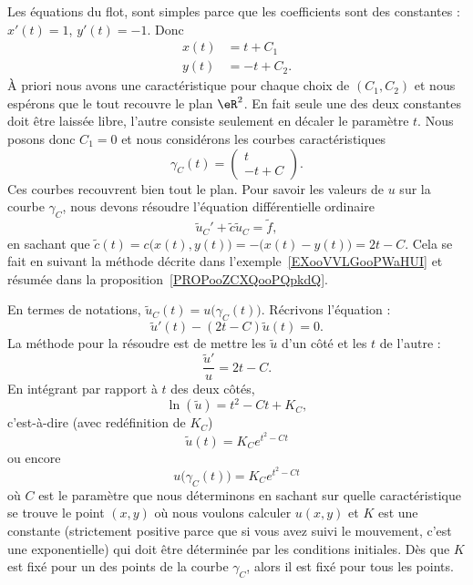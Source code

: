 Les équations du flot, sont simples parce que les coefficients sont des constantes : \( x'(t)=1\), \( y'(t)=-1\). Donc
\begin{subequations}
	\begin{align}
		x(t) & =t+C_1   \\
		y(t) & =-t+C_2.
	\end{align}
\end{subequations}
À priori nous avons une caractéristique pour chaque choix de \( (C_1,C_2)\) et nous espérons que le tout recouvre le plan \( \eR^2\). En fait seule une des deux constantes doit être laissée libre, l'autre consiste seulement en décaler le paramètre \( t\). Nous posons donc \( C_1=0\) et nous considérons les courbes caractéristiques
\begin{equation}
	\gamma_C(t)=\begin{pmatrix}
		t \\
		-t+C
	\end{pmatrix}.
\end{equation}
Ces courbes recouvrent bien tout le plan. Pour savoir les valeurs de \( u\) sur la courbe \( \gamma_C\), nous devons résoudre l'équation différentielle ordinaire
\begin{equation}
	\tilde u_C'+\tilde c\tilde u_C=\tilde f,
\end{equation}
en sachant que \( \tilde c(t)=c\big( x(t),y(t) \big)=-\big( x(t)-y(t) \big)=2t-C\). Cela se fait en suivant la méthode décrite dans l'exemple~\ref{EXooVVLGooPWaHUI} et résumée dans la proposition~\ref{PROPooZCXQooPQpkdQ}.

En termes de notations, \( \tilde u_C(t)=u\big( \gamma_C(t) \big)\). Récrivons l'équation :
\begin{equation}
	\tilde u'(t)-(2t-C)\tilde u(t)=0.
\end{equation}
La méthode pour la résoudre est de mettre les \( \tilde u\) d'un côté et les \( t\) de l'autre :
\begin{equation}
	\frac{ \tilde u' }{ u }=2t-C.
\end{equation}
En intégrant par rapport à \( t\) des deux côtés,
\begin{equation}
	\ln(\tilde u)=t^2-Ct+K_C,
\end{equation}
c'est-à-dire (avec redéfinition de \( K_C\))
\begin{equation}
	\tilde u(t)=K_C e^{t^2-Ct}
\end{equation}
ou encore
\begin{equation}   \label{EQooSSTJooEQfRnP}
	u\big( \gamma_C(t) \big)=K_C e^{t^2-Ct}
\end{equation}
où \( C\) est le paramètre que nous déterminons en sachant sur quelle caractéristique se trouve le point \( (x,y)\) où nous voulons calculer \( u(x,y)\) et \( K\) est une constante (strictement positive parce que si vous avez suivi le mouvement, c'est une exponentielle) qui doit être déterminée par les conditions initiales. Dès que \( K\) est fixé pour un des points de la courbe \( \gamma_C\), alors il est fixé pour tous les points.

